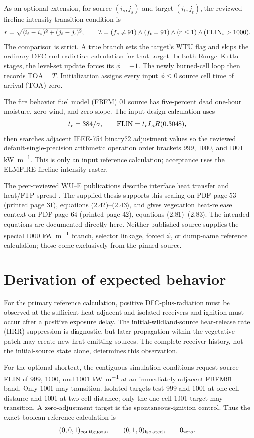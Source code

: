 As an optional extension, for source \((i_s,j_s)\) and target \((i_t,j_t)\),
the reviewed fireline-intensity transition condition is
\[
 r=\sqrt{(i_t-i_s)^2+(j_t-j_s)^2},\qquad
 \mathcal I=(f_s\ne91)\land(f_t=91)\land(r\le1)
             \land(\mathrm{FLIN}_s>1000).
\]
The comparison is strict.  A true branch sets the target's WTU flag and skips
the ordinary DFC and radiation calculation for that target.  In both Runge--Kutta
stages, the level-set update forces its
\(\phi=-1\).  The newly burned-cell loop then records
\(\mathrm{TOA}=T\).  Initialization assigns every input \(\phi\le0\) source
cell time of arrival (TOA) zero.

The fire behavior fuel model (FBFM) 01 source has five-percent dead one-hour moisture, zero wind, and zero
slope.  The input-design calculation uses
\[
 t_r=384/\sigma,\qquad \mathrm{FLIN}=t_r I_R R(0.3048),
\]
then searches adjacent IEEE-754 binary32 adjustment values so the reviewed
default-single-precision arithmetic operation order brackets 999, 1000, and 1001
\si{\kilo\watt\per\metre}.  This is only an input reference calculation; acceptance uses the
ELMFIRE fireline intensity raster.

The peer-reviewed WU--E publications describe interface heat transfer and
heat/FTP spread \cite{PurnomoPCI2024,PurnomoIJWF2024}. The supplied thesis supports
this scaling on PDF page 53 (printed page 31), equations (2.42)--(2.43), and
gives vegetation heat-release context on PDF page 64 (printed page 42),
equations (2.81)--(2.83). The intended equations are documented directly here.
Neither published source supplies the special 1000 \si{\kilo\watt\per\metre} branch,
selector linkage, forced \(\phi\), or dump-name reference calculation; those come exclusively
from the pinned source.

\section{Derivation of expected behavior}

For the primary reference calculation, positive DFC-plus-radiation must be observed at the
sufficient-heat adjacent and isolated receivers and ignition must occur after
a positive exposure delay. The initial-wildland-source heat-release rate (HRR) suppression is diagnostic, but later
propagation within the vegetative patch may create new heat-emitting sources.
The complete receiver history, not the initial-source state alone, determines
this observation.

For the optional shortcut, the contiguous simulation conditions request source FLIN of 999, 1000, and 1001
\si{\kilo\watt\per\metre} at an immediately adjacent FBFM91 band.  Only 1001
may transition.  Isolated targets test 999 and 1001 at one-cell distance and
1001 at two-cell distance; only the one-cell 1001 target may transition.  A
zero-adjustment target is the spontaneous-ignition control.  Thus the exact
boolean reference calculation is
\[
 (0,0,1)_{\rm contiguous},\qquad(0,1,0)_{\rm isolated},\qquad0_{\rm zero}.
\]

